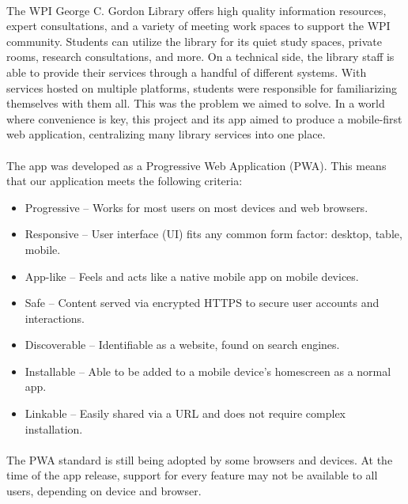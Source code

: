 \paragraph{}

    The WPI George C. Gordon Library offers high quality information resources, expert consultations, and a variety of meeting work spaces to support the WPI community. Students can utilize the library for its quiet study spaces, private rooms, research consultations, and more. On a technical side, the library staff is able to provide their services through a handful of different systems. With services hosted on multiple platforms, students were responsible for familiarizing themselves with them all. This was the problem we aimed to solve. In a world where convenience is key, this project and its \appname app aimed to produce a mobile-first web application, centralizing many library services into one place.

\paragraph{}

    The \appname app was developed as a Progressive Web Application (PWA). This means that our application meets the following criteria:
    
    \begin{itemize}[label={\checkmark}]
        \item Progressive  -- Works for most users on most devices and web browsers.
        \item Responsive   -- User interface (UI) fits any common form factor: desktop, table, mobile.
        \item App-like     -- Feels and acts like a native mobile app on mobile devices.
        \item Safe         -- Content served via encrypted HTTPS to secure user accounts and interactions.
        \item Discoverable -- Identifiable as a website, found on search engines.
        \item Installable  -- Able to be added to a mobile device's homescreen as a normal app.
        \item Linkable     -- Easily shared via a URL and does not require complex installation.
    \end{itemize}

\paragraph{}

    The PWA standard is still being adopted by some browsers and devices. At the time of the \appname app release, support for every feature may not be available to all users, depending on device and browser.
